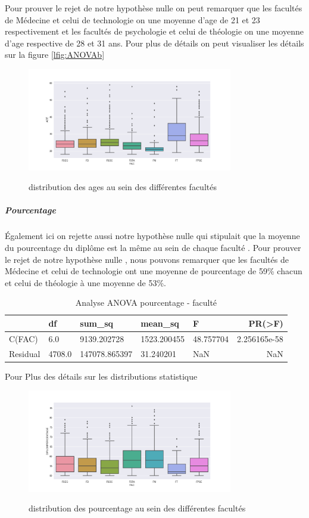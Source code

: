  Pour prouver le rejet de notre hypothèse nulle on peut remarquer que les
 facultés de Médecine et celui de technologie on une moyenne d'age de 21
 et 23 respectivement et les facultés de psychologie et celui de
 théologie on une moyenne d'age respective de 28 et 31 ans.
 Pour plus de détails on peut visualiser les détails sur la figure \ref{lfig:ANOVAb}
 	\begin{figure}[!htbp]
 	\centering
 	\includegraphics[width=0.8\textwidth]{fig/AGE-FAC.png}\label{fig:ANOVAb}
 	\caption{distribution des ages au sein des différentes facultés } 
 	\end{figure}
\subparagraph{Pourcentage}
  Également ici on rejette aussi notre hypothèse nulle qui stipulait que la
moyenne du pourcentage du diplôme est la même au sein de chaque faculté
. Pour prouver le rejet de notre hypothèse nulle , nous  pouvons remarquer que
les facultés de Médecine et celui de technologie ont une moyenne de
pourcentage de 59\% chacun et celui de théologie à une moyenne de 53\%.
\begin{table}[!htbp]
	\centering
	\begingroup %
	\captionsetup{type=table} %
	\caption{Analyse ANOVA pourcentage - faculté}
	\label{tab:ANOVAPourcentage}
	\begin{tabular}{lllllr}
		\toprule
		{} & df     &   sum\_sq &     mean\_sq      &     F    &     PR(>F) \\
		\midrule
		C(FAC)    &   6.0  &  9139.202728  &1523.200455  &48.757704&  2.256165e-58 \\
		Residual & 4708.0 & 147078.865397 &   31.240201  &      NaN      &     NaN \\
		\bottomrule
	\end{tabular}
	\endgroup
\end{table}
Pour Plus des détails sur les distributions statistique 
\begin{figure}[!htbp]
	\centering
	\includegraphics[width=0.8\textwidth]{fig/AGE-POURC.png}\label{fig:ANOVAa}
	\caption{distribution des pourcentage au sein des différentes facultés } 
\end{figure}
